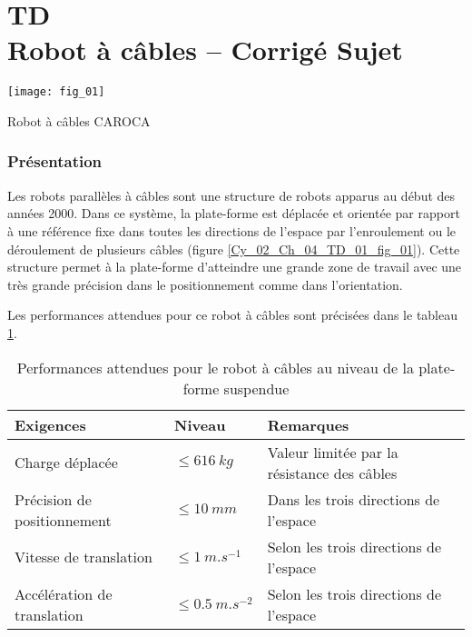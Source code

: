 \chapter*{TD  \\ 
Robot à câbles -- 
\ifprof Corrigé \else Sujet \fi}

\iflivret {} \else
\ifprof  {} \else \fi
\fi

\setcounter{question}{0}

\begin{marginfigure}
\centering
\texttt{[image: fig\_01]}
\caption{Robot à câbles CAROCA \label{Cy_02_Ch_04_TD_01_fig_01}}
\end{marginfigure}


\subsection*{Présentation}
\ifprof
\else
 Les robots parallèles à câbles sont une structure de robots apparus au début des années 2000. Dans ce système, la plate-forme est déplacée et orientée par rapport à une référence fixe dans toutes les directions de l’espace par l’enroulement ou le déroulement de plusieurs câbles (figure \ref{Cy_02_Ch_04_TD_01_fig_01}). Cette structure permet à la plate-forme d’atteindre une grande zone de travail avec une très grande précision dans le positionnement comme dans l’orientation.

 Les performances attendues pour ce robot à câbles sont précisées dans le tableau \ref{Cy_02_Ch_04_TD_01_tab_01}.

\begin{table}[!h]
\centering
\begin{tabular}{llp{5.5cm}}
\hline
\textbf{Exigences} & \textbf{Niveau} & \textbf{Remarques} \\
\hline
Charge déplacée & $\leq \SI{616}{kg}$ & Valeur limitée par la résistance des câbles \\
Précision de positionnement & $\leq \SI{10}{mm}$ & Dans les trois directions de l’espace \\
Vitesse de translation & $\leq \SI{1}{m.s^{-1}}$ & Selon les trois directions de l’espace \\
Accélération de translation & $\leq  \SI{0,5}{m.s^{-2}}$ & Selon les trois directions de l’espace \\
\hline
\end{tabular}
\caption{Performances attendues pour le robot à câbles au niveau de la plate-forme suspendue \label{Cy_02_Ch_04_TD_01_tab_01}}
\end{table}
\fi


